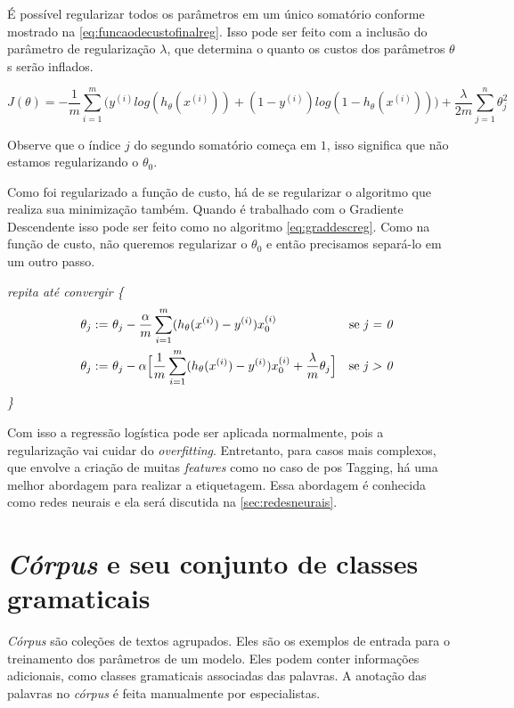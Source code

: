É possível regularizar todos os parâmetros em um único somatório conforme mostrado na \autoref{eq:funcaodecustofinalreg}. Isso pode ser feito com a inclusão do parâmetro de regularização $\lambda$, que determina o quanto os custos dos parâmetros $\theta$s serão inflados.

\begin{equation} \label{eq:funcaodecustofinalreg}
J(\theta) = - \frac{1}{m}\sum\limits_{i=1}^{m}\Big( y^{(i)}log(h_{\theta}(x^{(i)})) + (1-y^{(i)})log(1 - h_{\theta}(x^{(i)})) \Big)
+ \frac{\lambda}{2m}\sum\limits_{j=1}^{n} \theta_j^2
\end{equation}

Observe que o índice $j$ do segundo somatório começa em $1$, isso significa que não estamos regularizando o $\theta_0$.

Como foi regularizado a função de custo, há de se regularizar o algoritmo que realiza sua minimização também. Quando é trabalhado com o Gradiente Descendente isso pode ser feito como no algoritmo \ref{eq:graddescreg}. Como na função de custo, não queremos regularizar o $\theta_0$ e então precisamos separá-lo em um outro passo.

\textit{repita até convergir \{}
\begin{align} 
\quad \theta_j := &\ \theta_j - \frac{\alpha}{m} \sum\limits_{i=1}^{m}(h_{\theta}(x^{(i)}) - y^{(i)}) x_0^{(i)} & \text{se \textit{j = 0}} \nonumber \\
\quad \theta_j := &\ \theta_j - \alpha \Big[ \frac{1}{m} \sum\limits_{i=1}^{m} (h_{\theta}(x^{(i)}) - y^{(i)}) x_0^{(i)} + \frac{\lambda}{m}\theta_j \Big] & \text{se \textit{j > 0}} \label{eq:graddescreg}
\end{align}
\textit{\quad\quad\quad \}}

Com isso a regressão logística pode ser aplicada normalmente, pois a regularização vai cuidar do \textit{overfitting}. Entretanto, para casos mais complexos, que envolve a criação de muitas \textit{features} como no caso de \ac{pos} Tagging, há uma melhor abordagem para realizar a etiquetagem. Essa abordagem é conhecida como redes neurais e ela será discutida na \autoref{sec:redesneurais}.


\section{\textit{Córpus} e seu conjunto de classes gramaticais}

\textit{Córpus} são coleções de textos agrupados. Eles são os exemplos de entrada para o treinamento dos parâmetros de um modelo. Eles podem conter informações adicionais, como classes gramaticais associadas das palavras. A anotação das palavras no \textit{córpus} é feita manualmente por especialistas.

